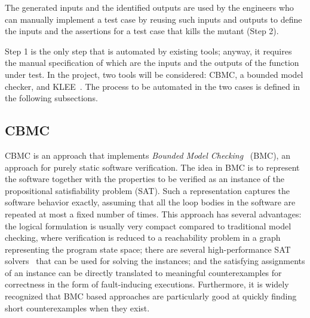  The generated inputs and the identified outputs are used by the engineers who can manually implement a test case by reusing such inputs and outputs to define the inputs and the assertions for a test case that kills the mutant (Step 2). 
 


Step 1 is the only step that is automated by existing tools; anyway, it requires the manual specification of which are the inputs and the outputs of the function under test. In the project, two tools will be considered: CBMC, a bounded model checker, and KLEE~\cite{cadar2008klee}. The process to be automated in the two cases is defined in the following subsections.

\subsection{CBMC}

CBMC is an approach that implements {\em Bounded Model
Checking}~\cite{BiereCCZ:TACAS99,SeryFS:ATVA12} (BMC), an approach for purely static software verification.
The idea in BMC is to represent the software together with the
properties to be verified as an instance of the propositional
satisfiability problem (SAT).  Such a representation captures the
software behavior exactly, assuming that all the loop bodies in the
software are repeated at most a fixed number of times.
%
This approach has several advantages: the logical formulation is usually
very compact compared to traditional model checking, where verification
is reduced to a reachability problem in a graph representing the program
state space;
%
there are several high-performance SAT
solvers~\cite{MarquesSilva:IEEETRAN99,EenS:SAT2003} that can be used for
solving the instances;
%
and the satisfying assignments of an instance can be directly translated
to meaningful counterexamples for correctness in the form of
fault-inducing executions.
%
Furthermore, it is widely recognized that BMC based approaches are particularly good
at quickly finding short counterexamples when they exist.

